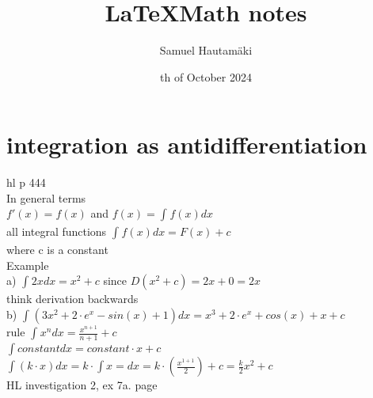\documentclass{article}
\title{\LaTeX Math notes}
\author{Samuel Hautamäki}
\date{th of October 2024}
\begin{document}
  \maketitle
   
  \section{integration as antidifferentiation}
  hl p 444\\
  In general terms\\
  $f'(x)=f(x)$ and $f(x)=\int_{} f(x) dx$\\
  all integral functions $\int_{}^{} f(x) dx=F(x)+c$\\
  where c is a constant\\
  Example \\
  a) $\int_{}^{} 2x dx= x^2 +c$ since $D(x^2+c)=2x+0=2x$\\
  think derivation backwards\\
  b) $\int_{}^{} (3x^2+2\cdot e^x-sin(x)+1) dx=x^3+2\cdot e^x+cos(x)+x+c$\\
  rule $\int_{}^{} x^n dx=\frac{x^{n+1}}{n+1}+c$\\
  $\int constant dx= constant\cdot x +c$\\
  $\int (k\cdot x) dx=k\cdot \int x=dx=k\cdot(\frac{x^{1+1}}{2})+c=\frac{k}{2}x^2+c$\\
  HL investigation 2, ex 7a. page\\
  
\end{document}

